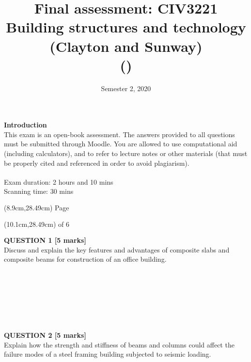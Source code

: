 \documentclass[a4paper,11pt]{article}
\title{Final assessment: CIV3221 Building structures and technology (Clayton and Sunway)\\
\VAR{FullName} (\VAR{StudentID})}
\date{Semester 2, 2020}
\begin{document}
\maketitle

\begin{introduction}	
\noindent
\textbf{Introduction}\\
\noindent
This exam is an open-book assessment. The answers provided to all questions must be submitted through Moodle. You are allowed to use computational aid (including calculators), and to refer to lecture notes or other materials (that must be properly cited and referenced in order to avoid plagiarism).\\
\\ 
\noindent
Exam duration: 2 hours and 10 mins\\
\noindent
Scanning time: 30 mins\\

\end{introduction}
\begin{textblock*}{5cm}(8.9cm,28.49cm)
Page
\end{textblock*}
\begin{textblock*}{5cm}(10.1cm,28.49cm)
of 6
\end{textblock*}
\newpage
\noindent
\textbf{QUESTION 1 [5 marks]}\\
Discuss and explain the key features and advantages of composite slabs and composite beams for construction of an office building.\\
\\
\\
\\
\\
\\
\\
\\
\noindent
\textbf{QUESTION 2 [5 marks]}\\
Explain how the strength and stiffness of beams and columns could affect the failure modes of a steel framing building subjected to seismic loading.\\
\\
\\
\\
\\
\\
\\
\\
\end{document}
